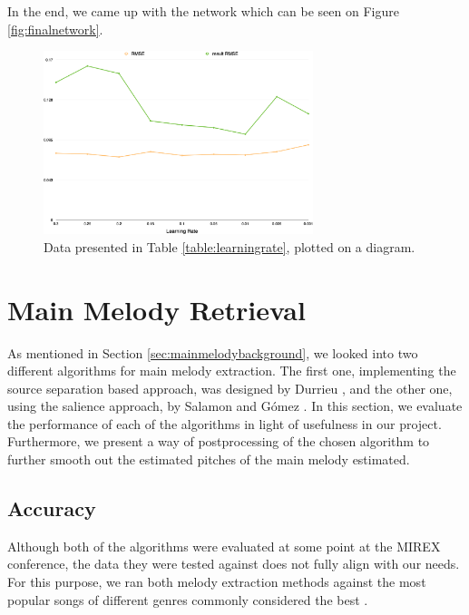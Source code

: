 In the end, we came up with the network which can be seen on Figure \ref{fig:finalnetwork}.

\begin{figure}[h]
	\centering
   \includegraphics[width=0.7\textwidth]{Figures/learningrate}
\caption{Data presented in Table \ref{table:learningrate}, plotted on a diagram.}
\end{figure}

\vspace{20pt}

\section{Main Melody Retrieval}

As mentioned in Section \ref{sec:mainmelodybackground}, we looked into two different algorithms for main melody extraction. The first one, implementing the source separation based approach, was designed by Durrieu \cite{durrieu}, and the other one, using the salience approach, by Salamon and G\'{o}mez \cite{salamon}. In this section, we evaluate the performance of each of the algorithms in light of usefulness in our project. Furthermore, we present a way of postprocessing of the chosen algorithm to further smooth out the estimated pitches of the main melody estimated.

\vspace{10pt}


\subsection{Accuracy}

Although both of the algorithms were evaluated at some point at the MIREX conference, the data they were tested against does not fully align with our needs. For this purpose, we ran both melody extraction methods against the most popular songs of different genres commonly considered the best \cite{toplists}.

